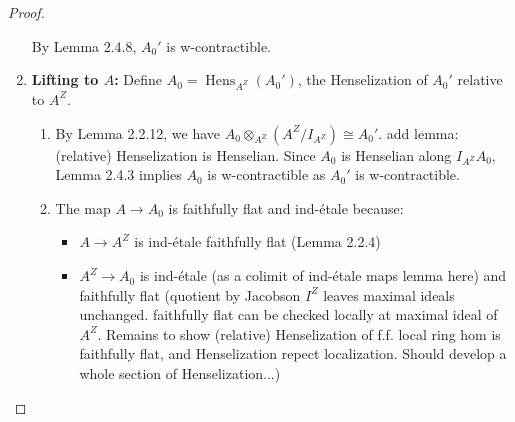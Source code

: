 \begin{proof}
\begin{enumerate}
        By Lemma 2.4.8, $A_0'$ is w-contractible.

        \item \textbf{Lifting to $A$:} 
        Define $A_0 = \operatorname{Hens}_{A^Z}(A_0')$, the Henselization of $A_0'$ relative to $A^Z$.
        
        \begin{enumerate}
            \item By Lemma 2.2.12, we have $A_0 \otimes_{A^Z} (A^Z/I_{A^Z}) \cong A_0'$. {\red add lemma: (relative) Henselization is Henselian.}
            Since $A_0$ is Henselian along $I_{A^Z}A_0$, Lemma 2.4.3 implies $A_0$ is w-contractible as $A_0'$ is w-contractible.

            \item The map $A \to A_0$ is faithfully flat and ind-étale because:
            \begin{itemize}
                \item $A \to A^Z$ is ind-étale faithfully flat (Lemma 2.2.4)
                \item $A^Z \to A_0$ is ind-étale (as a colimit of ind-étale maps {\red lemma here}) and faithfully flat {\red(quotient by Jacobson \(I^Z\) leaves maximal ideals unchanged. faithfully flat can be checked locally at maximal ideal of \(A^Z\). Remains to show (relative) Henselization of f.f. local ring hom is faithfully flat, and Henselization repect localization. Should develop a whole section of Henselization...)}
            \end{itemize}
        \end{enumerate}
\end{enumerate}


\end{proof}

